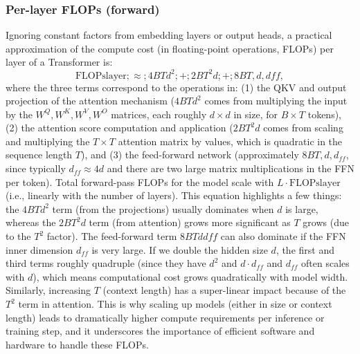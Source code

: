 \subsubsection{Per-layer FLOPs (forward)}
Ignoring constant factors from embedding layers or output heads, a practical approximation of the compute cost (in floating-point operations, FLOPs) per layer of a Transformer is:
\begin{equation}
\label{eq:flops-layer}
\text{FLOPs}{\text{layer}} ;\approx; 4 B T d^2 ;+; 2 B T^2 d ;+; 8 B T, d, d{ff},
\end{equation}
where the three terms correspond to the operations in: (1) the QKV and output projection of the attention mechanism ($4 B T d^2$ comes from multiplying the input by the $W^Q, W^K, W^V, W^O$ matrices, each roughly $d \times d$ in size, for $B \times T$ tokens), (2) the attention score computation and application ($2 B T^2 d$ comes from scaling and multiplying the $T \times T$ attention matrix by values, which is quadratic in the sequence length $T$), and (3) the feed-forward network (approximately $8 B T, d, d_{ff}$, since typically $d_{ff} \approx 4d$ and there are two large matrix multiplications in the FFN per token). Total forward-pass FLOPs for the model scale with $L \cdot \text{FLOPs}{\text{layer}}$ (i.e., linearly with the number of layers). This equation highlights a few things: the $4 B T d^2$ term (from the projections) usually dominates when $d$ is large, whereas the $2 B T^2 d$ term (from attention) grows more significant as $T$ grows (due to the $T^2$ factor). The feed-forward term $8 B T d d{ff}$ can also dominate if the FFN inner dimension $d_{ff}$ is very large. If we double the hidden size $d$, the first and third terms roughly quadruple (since they have $d^2$ and $d \cdot d_{ff}$ and $d_{ff}$ often scales with $d$), which means computational cost grows quadratically with model width. Similarly, increasing $T$ (context length) has a super-linear impact because of the $T^2$ term in attention. This is why scaling up models (either in size or context length) leads to dramatically higher compute requirements per inference or training step, and it underscores the importance of efficient software and hardware to handle these FLOPs.

